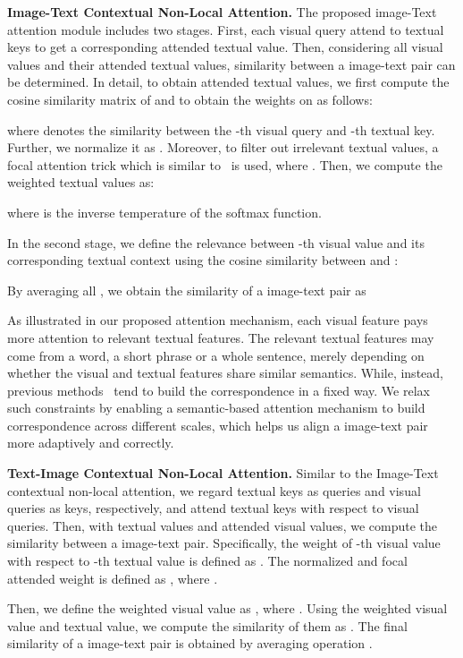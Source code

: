\documentclass[final]{cvpr}
\begin{document}
\textbf{Image-Text Contextual Non-Local Attention.} The proposed image-Text attention module includes two stages. 
First, each visual query attend to textual keys to get a corresponding attended textual value. 
Then, considering all visual values and their attended textual values, similarity between a image-text pair can be determined. 
In detail, to obtain attended textual values, we first compute the cosine similarity matrix of  and  to obtain the weights on  as follows:

where  denotes the similarity between the -th visual query and -th textual key. Further, we normalize it as . Moreover, to filter out irrelevant textual values, a focal attention trick which is similar to~\cite{Liu2019FocusYA} is used, where . Then, we compute the weighted textual values as:

where  is the inverse temperature of the softmax function.

In the second stage, we define the relevance between -th visual value and its corresponding textual context using the cosine similarity between  and :

By averaging all , we obtain the similarity of a image-text pair as

As illustrated in our proposed attention mechanism, each visual feature pays more attention to relevant textual features. The relevant textual features may come from a word, a short phrase or a whole sentence, merely depending on whether the visual and textual features share similar semantics. While, instead, previous methods~\cite{wang2020vitaa,jing2020pose} tend to build the correspondence in a fixed way. We relax such constraints by enabling a semantic-based attention mechanism to build correspondence across different scales, which helps us align a image-text pair more adaptively and correctly.

\textbf{Text-Image Contextual Non-Local Attention.} Similar to the Image-Text contextual non-local attention, we regard textual keys as queries and visual queries as keys, respectively, and attend textual keys with respect to visual queries. Then, with textual values and attended visual values, we compute the similarity between a image-text pair. Specifically, the weight of -th visual value with respect to -th textual value is defined as . The normalized and focal attended weight is defined as , where .

Then, we define the weighted visual value as , where . Using the weighted visual value  and textual value, we compute the similarity of them as . The final similarity of a image-text pair is obtained by averaging operation .
\end{document}
